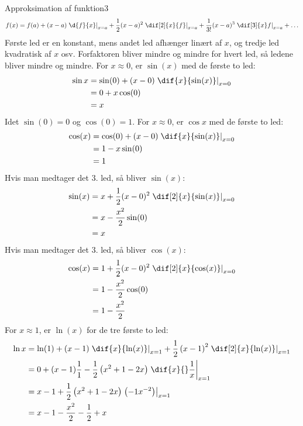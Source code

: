 \begin{opgave}{Approksimation af funktion}{3}
  \[
  f(x) = f(a) + (x-a) \left.\d{f}{x}\right|_{x=a}
  + \frac{1}{2} (x-a)^2 \left.\dif[2]{x}{f}\right|_{x=a}
  + \frac{1}{3!} (x-a)^3 \left.\dif[3]{x}f\right|_{x=a}
  + \ldots
  \]
  \opg Første led er en konstant, mens andet led afhænger linært af $x$, og tredje led kvadratisk af $x$ osv. Forfaktoren bliver mindre og mindre for hvert led, så ledene bliver mindre og mindre.
  \opg For $x \approx 0$, er $\sin (x)$ med de første to led:
  \begin{align*}
  \sin x &= \sin(0) + (x-0) \left. \dif{x}{\sin (x)}\right|_{x=0} \\
  &= 0 + x\cos(0) \\
  &= x
  \end{align*}
  Idet $\sin(0)=0$ og $\cos(0)=1$.
  For $x \approx 0$, er $\cos x$ med de første to led:
  \begin{align*}
  \cos (x) &= \cos(0) + (x-0) \left.\dif{x}{\sin (x)}\right|_{x=0} \\
  &= 1 -x\sin(0) \\
  &= 1
  \end{align*}
  Hvis man medtager det 3. led, så bliver $\sin(x)$:
  \begin{align*}
  \sin(x) &= x + \frac{1}{2} (x-0)^2 \left. \dif[2]{x}{\sin(x)}\right|_{x=0} \\
  &= x - \frac{x^2}{2} \sin(0) \\
  &= x  
  \end{align*}
  Hvis man medtager det 3. led, så bliver $\cos(x)$:
  \begin{align*}
  \cos(x) &= 1 + \frac{1}{2} (x-0)^2 \left.\dif[2]{x}{\cos(x)}\right|_{x=0} \\
  &= 1 - \frac{x^2}{2} \cos(0) \\
  &= 1 - \frac{x^2}{2}  
  \end{align*}
  \opg For $x \approx 1$, er $\ln (x)$ for de tre første to led:
  \begin{align*}
  \ln x &= \ln(1) + (x-1) \left. \dif{x}{\ln (x)} \right|_{x=1} + \frac{1}{2} \left(x-1\right)^2 \left. \dif[2]{x}{\ln (x)}\right|_{x=1} \\
  &= 0 + (x-1)\frac{1}{1} - \frac{1}{2} \left( x^2 +1 - 2x \right) \left. \dif{x}{} \frac{1}{x} \right|_{x=1} \\
  &= x -1 + \frac{1}{2} \left( x^2 + 1 - 2x \right) \left. \left( -1 x^{-2} \right)\right|_{x=1} \\
  &= x - 1 - \frac{x^2}{2} - \frac{1}{2} + x\\

\end{align*}
\end{opgave}
